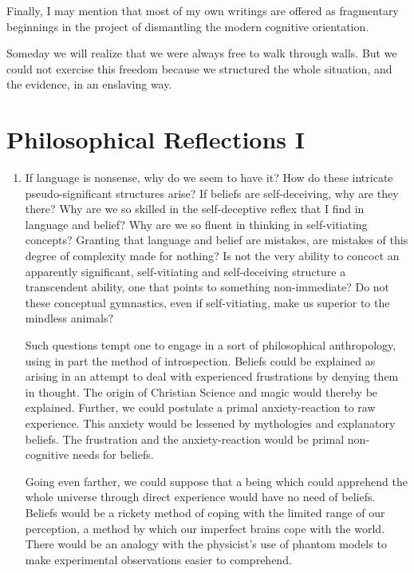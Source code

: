 \documentclass[10pt,twoside]{memoir}
\begin{document}
Finally, I may mention that most of my own writings are offered as 
fragmentary beginnings in the project of dismantling the modern cognitive 
orientation. 

Someday we will realize that we were always free to walk through 
walls. But we could not exercise this freedom because we structured the 
whole situation, and the evidence, in an enslaving way. 

\chapter{Philosophical Reflections I}

\begin{enumerate} %
\item If language is nonsense, why do we seem to have it? How do these 
intricate pseudo-significant structures arise? If beliefs are self-deceiving, why 
are they there? Why are we so skilled in the self-deceptive reflex that I find 
in language and belief? Why are we so fluent in thinking in self-vitiating 
concepts? Granting that language and belief are mistakes, are mistakes of 
this degree of complexity made for nothing? Is not the very ability to 
concoct an apparently significant, self-vitiating and self-deceiving structure a 
transcendent ability, one that points to something non-immediate? Do not 
these conceptual gymnastics, even if self-vitiating, make us superior to the 
mindless animals? 

Such questions tempt one to engage in a sort of philosophical 
anthropology, using in part the method of introspection. Beliefs could be 
explained as arising in an attempt to deal with experienced frustrations by 
denying them in thought. The origin of Christian Science and magic would 
thereby be explained. Further, we could postulate a primal anxiety-reaction 
to raw experience. This anxiety would be lessened by mythologies and 
explanatory beliefs. The frustration and the anxiety-reaction would be 
primal non-cognitive needs for beliefs. 

Going even farther, we could suppose that a being which could 
apprehend the whole universe through direct experience would have no need 
of beliefs. Beliefs would be a rickety method of coping with the limited 
range of our perception, a method by which our imperfect brains cope with 
the world. There would be an analogy with the physicist's use of phantom 
models to make experimental observations easier to comprehend. 


\end{enumerate}
\end{document}
